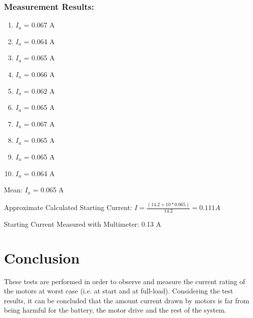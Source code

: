 \documentclass[10pt,a4paper]{article}
\begin{document}
\subsubsection{Measurement Results:}
\begin{enumerate}
\item $I_{a}$ = 0.067 A
\item $I_{a}$ = 0.064 A
\item $I_{a}$ = 0.065 A
\item $I_{a}$ = 0.066 A
\item $I_{a}$ = 0.062 A
\item $I_{a}$ = 0.065 A
\item $I_{a}$ = 0.067 A
\item $I_{a}$ = 0.065 A
\item $I_{a}$ = 0.065 A
\item $I_{a}$ = 0.064 A
\end{enumerate}
Mean: $I_{a}$ = 0.065 A
\vspace{0.5 cm}

Approximate Calculated Starting Current:
$I = \frac{(14.2+10*0.065)}{14.2} = 0.111 A$
\vspace{0.5 cm}
\par Starting Current Measured with Multimeter: 0.13 A

\section{Conclusion}
\hspace{0.5 cm}
These tests are performed in order to observe and measure the current rating of the motors at worst case (i.e. at start and at full-load). Considering the test results, it can be concluded that the amount current drawn by motors is far from being harmful for the battery, the motor drive and the rest of the system.
\end{document}
